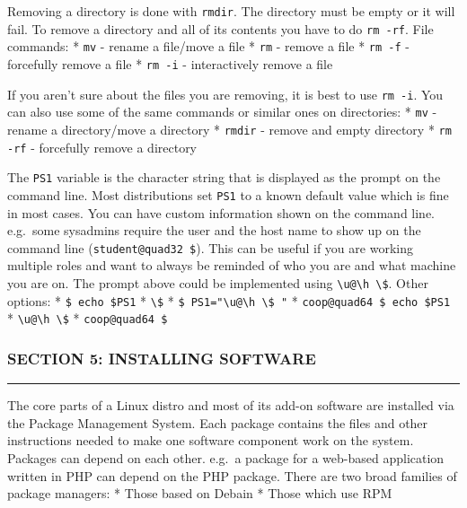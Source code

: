 Removing a directory is done with \texttt{rmdir}. The directory must be
empty or it will fail. To remove a directory and all of its contents you
have to do \texttt{rm -rf}. File commands: * \texttt{mv} - rename a
file/move a file * \texttt{rm} - remove a file * \texttt{rm -f} -
forcefully remove a file * \texttt{rm -i} - interactively remove a file

If you aren't sure about the files you are removing, it is best to use
\texttt{rm -i}. You can also use some of the same commands or similar
ones on directories: * \texttt{mv} - rename a directory/move a directory
* \texttt{rmdir} - remove and empty directory * \texttt{rm -rf} -
forcefully remove a directory

The \texttt{PS1} variable is the character string that is displayed as
the prompt on the command line. Most distributions set \texttt{PS1} to a
known default value which is fine in most cases. You can have custom
information shown on the command line. e.g.~some sysadmins require the
user and the host name to show up on the command line
(\texttt{student@quad32 \$}). This can be useful if you are working
multiple roles and want to always be reminded of who you are and what
machine you are on. The prompt above could be implemented using
\texttt{\textbackslash{}u@\textbackslash{}h \textbackslash{}\$}. Other
options: * \texttt{\$ echo \$PS1} * \texttt{\textbackslash{}\$} *
\texttt{\$ PS1="\textbackslash{}u@\textbackslash{}h \textbackslash{}\$ "}
* \texttt{coop@quad64 \$ echo \$PS1} *
\texttt{\textbackslash{}u@\textbackslash{}h \textbackslash{}\$} *
\texttt{coop@quad64 \$}

\subsubsection{SECTION 5: INSTALLING
SOFTWARE}\label{section-5-installing-software}

\begin{center}\rule{3in}{0.4pt}\end{center}

The core parts of a Linux distro and most of its add-on software are
installed via the Package Management System. Each package contains the
files and other instructions needed to make one software component work
on the system. Packages can depend on each other. e.g.~a package for a
web-based application written in PHP can depend on the PHP package.
There are two broad families of package managers: * Those based on
Debain * Those which use RPM

